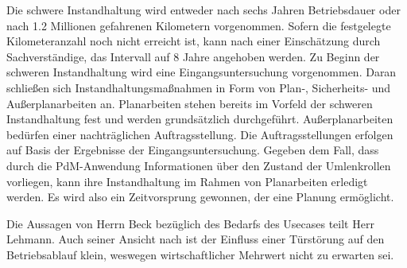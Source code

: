 Die schwere Instandhaltung wird entweder nach sechs Jahren Betriebsdauer oder nach \num{1.2} Millionen gefahrenen Kilometern vorgenommen. Sofern die festgelegte Kilometeranzahl noch nicht erreicht ist, kann nach einer Einschätzung durch Sachverständige, das Intervall	auf \num{8} Jahre angehoben werden. Zu Beginn der schweren Instandhaltung wird eine Eingangsuntersuchung vorgenommen. Daran schließen sich Instandhaltungsmaßnahmen in Form von Plan-, Sicherheits- und Außerplanarbeiten an. Planarbeiten stehen bereits im Vorfeld der schweren Instandhaltung fest und werden grundsätzlich durchgeführt. Außerplanarbeiten bedürfen einer nachträglichen Auftragsstellung. Die Auftragsstellungen erfolgen auf Basis der Ergebnisse der Eingangsuntersuchung. Gegeben dem Fall, dass durch die PdM-Anwendung Informationen über den Zustand der Umlenkrollen vorliegen, kann ihre Instandhaltung im Rahmen von Planarbeiten erledigt werden. Es wird also ein Zeitvorsprung gewonnen, der eine Planung ermöglicht.

Die Aussagen von Herrn Beck bezüglich des Bedarfs des Usecases teilt Herr Lehmann. Auch seiner Ansicht nach ist der Einfluss einer Türstörung auf den Betriebsablauf klein, weswegen wirtschaftlicher Mehrwert nicht zu erwarten sei.


